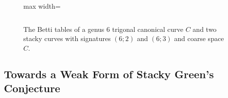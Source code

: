 \documentclass[11pt,reqno]{amsart}
\makeatletter
\theoremstyle{remark}
\newcommand{\z}{\textendash}               %
\newcommand{\h}[1]{{\scriptsize #1}}       %
\newenvironment{betti}[1]
  {\begingroup\setlength{\tabcolsep}{1.5pt}%
   \renewcommand{\arraystretch}{1.15}%
   \begin{tabular}[t]{@{}>{\scriptsize}r@{\hspace{5pt}}|*{#1}{B}@{}}}
  {\end{tabular}\endgroup}
\newcommand{\bettipanel}[2]{%
  \begin{tabular}[t]{@{}c@{}}\small #1\\[3pt] #2\end{tabular}}
\makeatother
\begin{document}
\begin{figure}
\begin{adjustbox}{max width=\linewidth}
\begin{tabular}{@{}l@{}}

\end{tabular}
\end{adjustbox}
\caption{The Betti tables of a genus 6 trigonal canonical curve $C$ and two stacky curves with signatures $(6;2)$ and $(6;3)$ and coarse space $C$.}
\end{figure}

\subsection{Towards a Weak Form of Stacky Green's Conjecture}\label{subsec:stacky-green}
\end{document}
